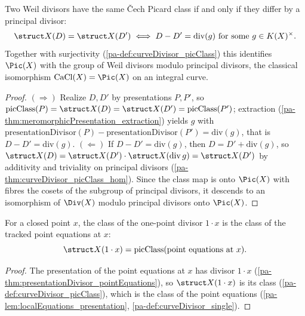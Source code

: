 \begin{theorem}
  \label{pa-thm:curveDivisor_picClass_eq_iff}
  \leanok

  Two Weil divisors have the same \v Cech Picard class if and only if they differ by a principal
  divisor:
  \[
    \struct X(D) = \struct X(D') \iff D - D' = \mathrm{div}(g) \text{ for some } g \in
      K(X)^{\times}.
  \]
  Together with surjectivity (\ref{pa-def:curveDivisor_picClass}) this identifies \(\Pic(X)\) with the
  group of Weil divisors modulo principal divisors, the classical isomorphism
  \(\mathrm{CaCl}(X) = \Pic(X)\) on an integral curve.
\end{theorem}
\begin{proof}
  \leanok
  \((\Rightarrow)\) Realize \(D, D'\) by presentations \(P, P'\), so \(\mathrm{picClass}(P) =
  \struct X(D) = \struct X(D') = \mathrm{picClass}(P')\); extraction
  (\ref{pa-thm:meromorphicPresentation_extraction}) yields \(g\) with
  \(\mathrm{presentationDivisor}(P) - \mathrm{presentationDivisor}(P') = \mathrm{div}(g)\), that is
  \(D - D' = \mathrm{div}(g)\). \((\Leftarrow)\) If \(D - D' = \mathrm{div}(g)\), then \(D = D' +
  \mathrm{div}(g)\), so \(\struct X(D) = \struct X(D') \cdot \struct X(\mathrm{div}\, g) = \struct
  X(D')\) by additivity and triviality on principal divisors
  (\ref{pa-thm:curveDivisor_picClass_hom}). Since the class map is onto \(\Pic(X)\) with fibres the
  cosets of the subgroup of principal divisors, it descends to an isomorphism of \(\Div(X)\) modulo
  principal divisors onto \(\Pic(X)\).
\end{proof}

\begin{theorem}
  \label{pa-thm:curveDivisor_picClass_single}
  \leanok

  For a closed point \(x\), the class of the one-point divisor \(1 \cdot x\) is the class of the
  tracked point equations at \(x\):
  \[
    \struct X(1 \cdot x) = \mathrm{picClass}(\text{point equations at } x).
  \]
\end{theorem}
\begin{proof}
  \leanok
  The presentation of the point equations at \(x\) has divisor \(1 \cdot x\)
  (\ref{pa-thm:presentationDivisor_pointEquations}), so \(\struct X(1 \cdot x)\) is its class
  (\ref{pa-def:curveDivisor_picClass}), which is the class of the point equations
  (\ref{pa-lem:localEquations_presentation}, \ref{pa-def:curveDivisor_single}).
\end{proof}

